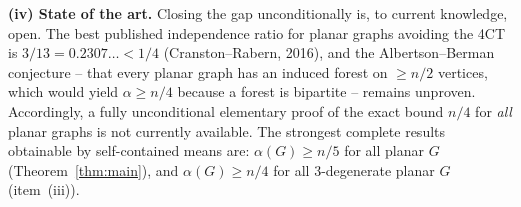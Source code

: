 \documentclass{amsart}
\theoremstyle{remark}
\begin{document}
\medskip
\noindent\textbf{(iv) State of the art.}
Closing the gap unconditionally is, to current knowledge, open. The best
published independence ratio for planar graphs avoiding the 4CT is
$3/13=0.2307\ldots<1/4$ (Cranston--Rabern, 2016), and the Albertson--Berman
conjecture -- that every planar graph has an induced forest on $\ge n/2$ vertices,
which would yield $\alpha\ge n/4$ because a forest is bipartite -- remains
unproven. Accordingly, a fully unconditional elementary proof of the exact bound
$n/4$ for \emph{all} planar graphs is not currently available. The strongest
complete results obtainable by self-contained means are: $\alpha(G)\ge n/5$ for
all planar $G$ (Theorem~\ref{thm:main}), and $\alpha(G)\ge n/4$ for all
$3$-degenerate planar $G$ (item~(iii)).
\end{document}
